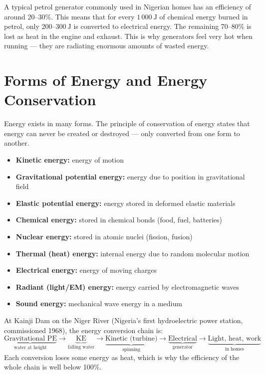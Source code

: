 \begin{realworldbox}
A typical petrol generator commonly used in Nigerian
homes has an efficiency of around 20--30\%. This means
that for every $1\,000\ \text{J}$ of chemical energy
burned in petrol, only $200$--$300\ \text{J}$ is
converted to electrical energy. The remaining 70--80\%
is lost as heat in the engine and exhaust. This is why
generators feel very hot when running --- they are
radiating enormous amounts of wasted energy.
\end{realworldbox}

\section{Forms of Energy and Energy Conservation}

Energy exists in many forms. The principle of
conservation of energy states that energy can never
be created or destroyed --- only converted from one
form to another.

\begin{defbox}
\begin{itemize}[noitemsep]
  \item \textbf{Kinetic energy:} energy of motion
  \item \textbf{Gravitational potential energy:}
  energy due to position in gravitational field
  \item \textbf{Elastic potential energy:} energy
  stored in deformed elastic materials
  \item \textbf{Chemical energy:} stored in chemical
  bonds (food, fuel, batteries)
  \item \textbf{Nuclear energy:} stored in atomic
  nuclei (fission, fusion)
  \item \textbf{Thermal (heat) energy:} internal
  energy due to random molecular motion
  \item \textbf{Electrical energy:} energy of moving
  charges
  \item \textbf{Radiant (light/EM) energy:}
  energy carried by electromagnetic waves
  \item \textbf{Sound energy:} mechanical wave energy
  in a medium
\end{itemize}
\end{defbox}

\begin{realworldbox}
At Kainji Dam on the Niger River (Nigeria's first
hydroelectric power station, commissioned 1968),
the energy conversion chain is:
\[
  \underbrace{\text{Gravitational PE}}_{\text{water at height}}
  \to \underbrace{\text{KE}}_{\text{falling water}}
  \to \underbrace{\text{Kinetic (turbine)}}_{\text{spinning}}
  \to \underbrace{\text{Electrical}}_{\text{generator}}
  \to \underbrace{\text{Light, heat, work}}_{\text{in homes}}
\]
Each conversion loses some energy as heat, which is why
the efficiency of the whole chain is well below 100\%.
\end{realworldbox}

